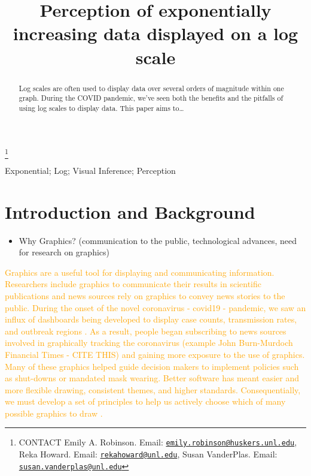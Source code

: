\documentclass[]{interact}
\theoremstyle{plain}%
\theoremstyle{definition}
\theoremstyle{remark}
\def\tightlist{}
\begin{document}

\title{Perception of exponentially increasing data displayed on a log scale}


\author{
}

\thanks{CONTACT Emily A. Robinson. Email: \href{mailto:emily.robinson@huskers.unl.edu}{\nolinkurl{emily.robinson@huskers.unl.edu}}, Reka Howard. Email: \href{mailto:rekahoward@unl.edu}{\nolinkurl{rekahoward@unl.edu}}, Susan VanderPlas. Email: \href{mailto:susan.vanderplas@unl.edu}{\nolinkurl{susan.vanderplas@unl.edu}}}

\maketitle

\begin{abstract}
Log scales are often used to display data over several orders of
magnitude within one graph. During the COVID pandemic, we've seen both
the benefits and the pitfalls of using log scales to display data. This
paper aims to\ldots{}
\end{abstract}

\begin{keywords}
Exponential; Log; Visual Inference; Perception
\end{keywords}

\hypertarget{introduction-and-background}{%
\section{Introduction and
Background}\label{introduction-and-background}}

\begin{itemize}
\tightlist
\item
  Why Graphics? (communication to the public, technological advances,
  need for research on graphics)
\end{itemize}

\textcolor{Orange}{
Graphics are a useful tool for displaying and communicating information. 
Researchers include graphics to communicate their results in scientific publications and news sources rely on graphics to convey news stories to the public. 
During the onset of the novel coronavirus - covid19 - pandemic, we saw an influx of dashboards being developed to display case counts, transmission rates, and outbreak regions \citep{lisa_charlotte_2020}.
As a result, people began subscribing to news sources involved in graphically tracking the coronavirus (example John Burn-Murdoch Financial Times - CITE THIS) and gaining more exposure to the use of graphics. 
Many of these graphics helped guide decision makers to implement policies such as shut-downs or mandated mask wearing. 
Better software has meant easier and more flexible drawing, consistent themes, and higher standards.
Consequentially, we must develop a set of principles to help us actively choose which of many possible graphics to draw \citep{unwin_why_2020}.
}
\end{document}
